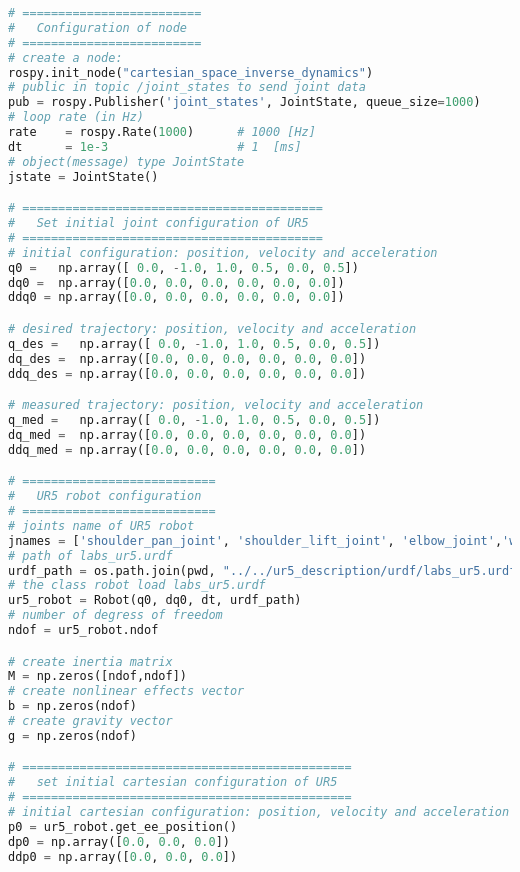 \begin{lstlisting}[language=Python, caption={Move the ur5 robot end-effector using the Cartesian space inverse dynamics and null space projection, \eqref{eq:cartesian_idyn_N_f_ext} to follows the Cartesian sinusoidal reference of activity \ref{subsec:generate_sinusoidal_reference} when external force is applied on end-effector.}, label={lst:cartesian_idyn_N_f_ext}]
# =========================
#   Configuration of node
# =========================
# create a node: 
rospy.init_node("cartesian_space_inverse_dynamics")
# public in topic /joint_states	to send joint data	
pub = rospy.Publisher('joint_states', JointState, queue_size=1000)
# loop rate (in Hz)
rate 	= rospy.Rate(1000)		# 1000 [Hz]
dt 		= 1e-3					# 1  [ms]
# object(message) type JointState
jstate = JointState()

# ==========================================
#   Set initial joint configuration of UR5
# ==========================================
# initial configuration: position, velocity and acceleration 
q0 =   np.array([ 0.0, -1.0, 1.0, 0.5, 0.0, 0.5])
dq0 =  np.array([0.0, 0.0, 0.0, 0.0, 0.0, 0.0]) 
ddq0 = np.array([0.0, 0.0, 0.0, 0.0, 0.0, 0.0]) 

# desired trajectory: position, velocity and acceleration
q_des =   np.array([ 0.0, -1.0, 1.0, 0.5, 0.0, 0.5])
dq_des =  np.array([0.0, 0.0, 0.0, 0.0, 0.0, 0.0]) 
ddq_des = np.array([0.0, 0.0, 0.0, 0.0, 0.0, 0.0]) 

# measured trajectory: position, velocity and acceleration
q_med =   np.array([ 0.0, -1.0, 1.0, 0.5, 0.0, 0.5])
dq_med =  np.array([0.0, 0.0, 0.0, 0.0, 0.0, 0.0]) 
ddq_med = np.array([0.0, 0.0, 0.0, 0.0, 0.0, 0.0]) 

# ===========================
#   UR5 robot configuration
# ===========================
# joints name of UR5 robot
jnames = ['shoulder_pan_joint', 'shoulder_lift_joint', 'elbow_joint','wrist_1_joint', 'wrist_2_joint', 'wrist_3_joint']
# path of labs_ur5.urdf
urdf_path = os.path.join(pwd, "../../ur5_description/urdf/labs_ur5.urdf")
# the class robot load labs_ur5.urdf
ur5_robot = Robot(q0, dq0, dt, urdf_path)
# number of degress of freedom
ndof = ur5_robot.ndof

# create inertia matrix 
M = np.zeros([ndof,ndof])
# create nonlinear effects vector
b = np.zeros(ndof)
# create gravity vector
g = np.zeros(ndof)

# ==============================================
#   set initial cartesian configuration of UR5
# ==============================================
# initial cartesian configuration: position, velocity and acceleration
p0 = ur5_robot.get_ee_position()
dp0 = np.array([0.0, 0.0, 0.0])
ddp0 = np.array([0.0, 0.0, 0.0])


\end{lstlisting}
